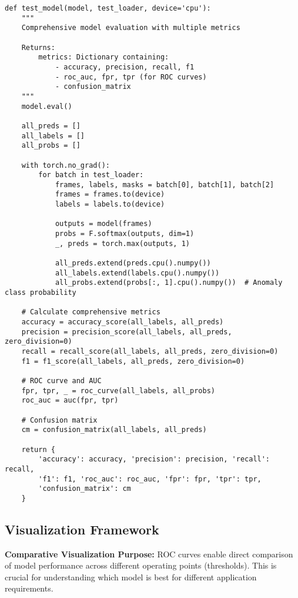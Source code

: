 \documentclass[12pt,a4paper]{article}
\begin{document}
\begin{lstlisting}[caption={Model Evaluation - Comprehensive Performance Assessment}]
def test_model(model, test_loader, device='cpu'):
    """
    Comprehensive model evaluation with multiple metrics

    Returns:
        metrics: Dictionary containing:
            - accuracy, precision, recall, f1
            - roc_auc, fpr, tpr (for ROC curves)
            - confusion_matrix
    """
    model.eval()

    all_preds = []
    all_labels = []
    all_probs = []

    with torch.no_grad():
        for batch in test_loader:
            frames, labels, masks = batch[0], batch[1], batch[2]
            frames = frames.to(device)
            labels = labels.to(device)

            outputs = model(frames)
            probs = F.softmax(outputs, dim=1)
            _, preds = torch.max(outputs, 1)

            all_preds.extend(preds.cpu().numpy())
            all_labels.extend(labels.cpu().numpy())
            all_probs.extend(probs[:, 1].cpu().numpy())  # Anomaly class probability

    # Calculate comprehensive metrics
    accuracy = accuracy_score(all_labels, all_preds)
    precision = precision_score(all_labels, all_preds, zero_division=0)
    recall = recall_score(all_labels, all_preds, zero_division=0)
    f1 = f1_score(all_labels, all_preds, zero_division=0)

    # ROC curve and AUC
    fpr, tpr, _ = roc_curve(all_labels, all_probs)
    roc_auc = auc(fpr, tpr)

    # Confusion matrix
    cm = confusion_matrix(all_labels, all_preds)

    return {
        'accuracy': accuracy, 'precision': precision, 'recall': recall,
        'f1': f1, 'roc_auc': roc_auc, 'fpr': fpr, 'tpr': tpr,
        'confusion_matrix': cm
    }
\end{lstlisting}

\subsection{Visualization Framework}

\textbf{Comparative Visualization Purpose:} ROC curves enable direct comparison of model performance across different operating points (thresholds). This is crucial for understanding which model is best for different application requirements.
\end{document}
